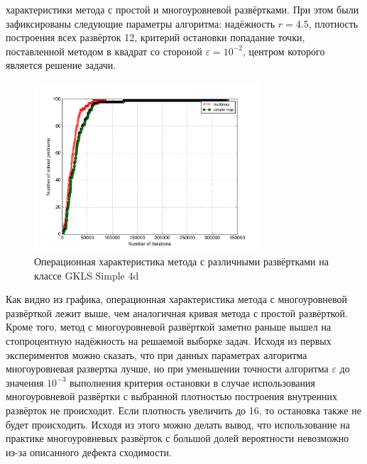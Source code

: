 характеристики метода с простой и многоуровневой развёртками. При этом были зафиксированы следующие параметры алгоритма: надёжность \(r=4.5\), плотность построения всех развёрток 12, критерий остановки попадание
точки, поставленной методом в квадрат со стороной \(\varepsilon=10^{-2}\), центром которого является решение задачи.
\begin{figure}[ht]
	\center
  \includegraphics[width=0.75\textwidth]{pictures/multimap_op.png}
  \caption{Операционная характеристика метода с различными развёртками на классе GKLS Simple 4d}
  \label{fig:multimapOP}
\end{figure}
Как видно из графика, операционная характеристика метода с многоуровневой развёрткой лежит выше, чем аналогичная кривая метода с простой развёрткой. Кроме того, метод с многоуровневой развёрткой
заметно раньше вышел на стопроцентную надёжность на решаемой выборке задач. Исходя из первых экспериментов можно сказать, что при данных параметрах алгоритма многоуровневая развертка лучше, но
при уменьшении точности алгоритма \(\varepsilon\) до значения \(10^{-3}\) выполнения критерия остановки в случае использования многоуровневой развёртки с выбранной плотностью построения внутренних развёрток не происходит.
Если плотность увеличить до 16, то остановка также не будет происходить. Исходя из этого можно делать вывод, что использование на практике многоуровневых развёрток с большой долей вероятности
невозможно из-за описанного дефекта сходимости.
